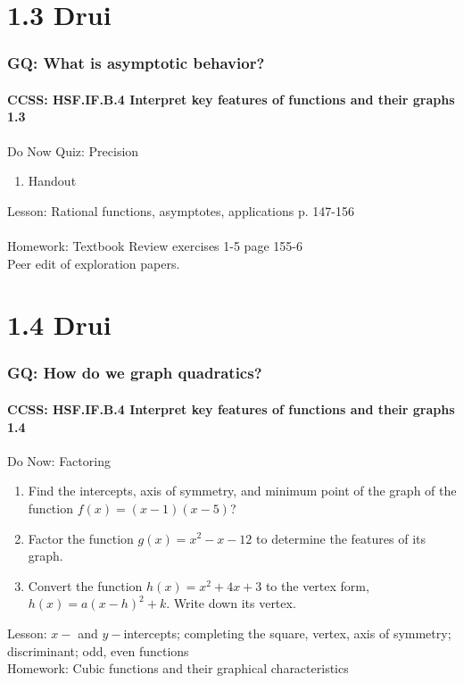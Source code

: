 \documentclass{beamer}
\begin{document}
\section{1.3 Drui}
  \frame
  {
    \frametitle{GQ: What is asymptotic behavior?}
    \framesubtitle{CCSS: HSF.IF.B.4 Interpret key features of functions and their graphs   \alert{1.3}}

    \begin{block}{Do Now Quiz: Precision}
    \begin{enumerate}
        \item Handout
    \end{enumerate}
    \end{block}
    Lesson: Rational functions, asymptotes, applications p. 147-156\\ [calculator graphing example]
    \\[10pt]
    Homework: Textbook Review exercises 1-5 page 155-6\\[10pt]
    Peer edit of exploration papers.
  }

\section{1.4 Drui}
  \frame
  {
    \frametitle{GQ: How do we graph quadratics?}
    \framesubtitle{CCSS: HSF.IF.B.4 Interpret key features of functions and their graphs   \alert{1.4}}

    \begin{block}{Do Now: Factoring}
    \begin{enumerate}
        \item Find the intercepts, axis of symmetry, and minimum point of the graph of the function $f(x)=(x-1)(x-5)$?
        \item Factor the function $g(x)=x^2-x-12$ to determine the features of its graph.
        \item Convert the function $h(x)=x^2+4x+3$ to the vertex form, $h(x)=a(x-h)^2+k$. Write down its vertex.
    \end{enumerate}
    \end{block}
    Lesson: $x-$ and $y-$intercepts; completing the square, vertex, axis of symmetry; discriminant; odd, even functions
    \\%
    Homework: Cubic functions and their graphical characteristics
  }
\end{document}
